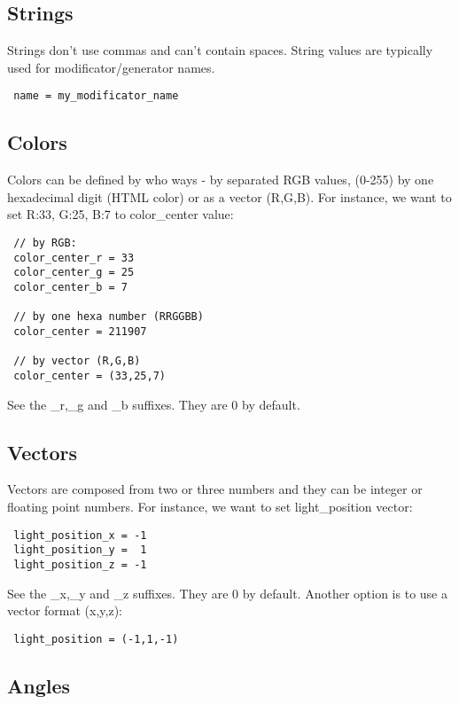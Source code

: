 \documentclass[11pt]{article}
\begin{document}
\subsection{Strings}

Strings don't use commas and can't contain spaces. String values are typically 
used for modificator/generator names.

\begin{verbatim}
 name = my_modificator_name
\end{verbatim}

\subsection{Colors}

Colors can be defined by who ways - by separated RGB values,
(0-255) by one hexadecimal digit (HTML color) or as a vector (R,G,B). 
For instance, we want to set R:33, G:25, B:7 to color\_center value:

\begin{verbatim}
 // by RGB:
 color_center_r = 33
 color_center_g = 25
 color_center_b = 7
 
 // by one hexa number (RRGGBB)
 color_center = 211907
 
 // by vector (R,G,B)
 color_center = (33,25,7) 
\end{verbatim}

See the \_r,\_g and \_b suffixes. They are 0 by default.

\subsection{Vectors}

Vectors are composed from two or three numbers and they
can be integer or floating point numbers. For instance, we want to 
set light\_position vector:

\begin{verbatim}
 light_position_x = -1
 light_position_y =  1
 light_position_z = -1
\end{verbatim}

See the \_x,\_y and \_z suffixes. They are 0 by default. Another option is
to use a vector format (x,y,z):

\begin{verbatim}
 light_position = (-1,1,-1)
\end{verbatim}

\subsection{Angles}
\end{document}
